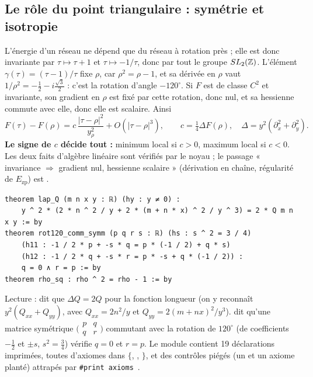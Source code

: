 \subsection{Le rôle du point triangulaire : symétrie et isotropie}\label{ch3:sec:isotropie}
L'énergie d'un réseau ne dépend que du réseau à rotation près ; elle est donc invariante par $\tau\mapsto\tau+1$ et
$\tau\mapsto-1/\tau$, donc par tout le groupe $SL_2(\mathbb{Z})$. L'élément $\gamma(\tau)=(\tau-1)/\tau$ fixe $\rho$, car
$\rho^2=\rho-1$, et sa dérivée en $\rho$ vaut $1/\rho^2=-\tfrac12-i\tfrac{\sqrt3}2$ : c'est la rotation d'angle
$-120^\circ$. Si $F$ est de classe $C^2$ et invariante, son gradient en $\rho$ est fixé par cette rotation, donc nul, et
sa hessienne commute avec elle, donc elle est scalaire. Ainsi
\begin{equation}\label{ch3:eq:courbure}
F(\tau)-F(\rho)=c\,\frac{|\tau-\rho|^2}{y_\rho^2}+O(|\tau-\rho|^3),\qquad c=\tfrac14\Delta F(\rho),\quad
\Delta=y^2(\partial_x^2+\partial_y^2).
\end{equation}
\textbf{Le signe de $c$ décide tout :} minimum local si $c>0$, maximum local si $c<0$. Les deux faits d'algèbre
linéaire sont vérifiés par le noyau \tierAs ; le passage « invariance $\Rightarrow$ gradient nul, hessienne scalaire »
(dérivation en chaîne, régularité de $E_{\mathrm{zp}}$) est \tierC.

\begin{leanbox}
\begin{lstlisting}[style=chIIIlean]
theorem lap_Q (m n x y : ℝ) (hy : y ≠ 0) :
    y ^ 2 * (2 * n ^ 2 / y + 2 * (m + n * x) ^ 2 / y ^ 3) = 2 * Q m n x y := by
theorem rot120_comm_symm (p q r s : ℝ) (hs : s ^ 2 = 3 / 4)
    (h11 : -1 / 2 * p + -s * q = p * (-1 / 2) + q * s)
    (h12 : -1 / 2 * q + -s * r = p * -s + q * (-1 / 2)) :
    q = 0 ∧ r = p := by
theorem rho_sq : rho ^ 2 = rho - 1 := by
\end{lstlisting}
\end{leanbox}
\noindent Lecture :  dit que $\Delta Q=2Q$ pour la fonction longueur (on y reconnaît
$y^2(Q_{xx}+Q_{yy})$, avec $Q_{xx}=2n^2/y$ et $Q_{yy}=2(m+nx)^2/y^3$).  dit qu'une matrice
symétrique $\bigl(\begin{smallmatrix}p&q\\q&r\end{smallmatrix}\bigr)$ commutant avec la rotation de $120^\circ$
(de coefficients $-\tfrac12$ et $\pm s$, $s^2=\tfrac34$) vérifie $q=0$ et $r=p$. Le module contient 19 déclarations
imprimées, toutes d'axiomes dans $\{$, , $\}$, et des contrôles
piégés (un  et un axiome planté) attrapés par \texttt{\#print axioms}~\cite{ch3-p2zp}. \tierAs

